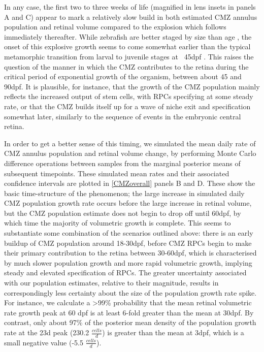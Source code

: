 In any case, the first two to three weeks of life (magnified in lens insets in panels A and C) appear to mark a relatively slow build in both estimated CMZ annulus population and retinal volume compared to the explosion which follows immediately thereafter. While zebrafish are better staged by size than age \cite{Parichy2009}, the onset of this explosive growth seems to come somewhat earlier than the typical metamorphic transition from larval to juvenile stages at ~45dpf \cite{Singleman2014}. This raises the question of the manner in which the CMZ contributes to the retina during the critical period of exponential growth of the organism, between about 45 and 90dpf. It is plausible, for instance, that the growth of the CMZ population mainly reflects the increased output of stem cells, with RPCs specifying at some steady rate, or that the CMZ builds itself up for a wave of niche exit and specification somewhat later, similarly to the sequence of events in the embryonic central retina.

In order to get a better sense of this timing, we simulated the mean daily rate of CMZ annulus population and retinal volume change, by performing Monte Carlo difference operations between samples from the marginal posterior means of subsequent timepoints. These simulated mean rates and their associated confidence intervals are plotted in \autoref{CMZoverall} panels B and D. These show the basic time-structure of the phenomenon; the large increase in simulated daily CMZ population growth rate occurs before the large increase in retinal volume, but the CMZ population estimate does not begin to drop off until 60dpf, by which time the majority of volumetric growth is complete. This seems to substantiate some combination of the scenarios outlined above: there is an early buildup of CMZ population around 18-30dpf, before CMZ RPCs begin to make their primary contribution to the retina between 30-60dpf, which is characterised by much slower population growth and more rapid volumetric growth, implying steady and elevated specification of RPCs. The greater uncertainty associated with our population estimates, relative to their magnitude, results in correspondingly less certainty about the size of the population growth rate spike. For instance, we calculate a >99\% probability that the mean retinal volumetric rate growth peak at 60 dpf is at least 6-fold greater than the mean at 30dpf. By contrast, only about 97\% of the posterior mean density of  the population growth rate at the 23d peak (230.2 $\frac{cells}{d}$) is greater than the mean at 3dpf, which is a small negative value (-5.5 $\frac{cells}{d}$). 

